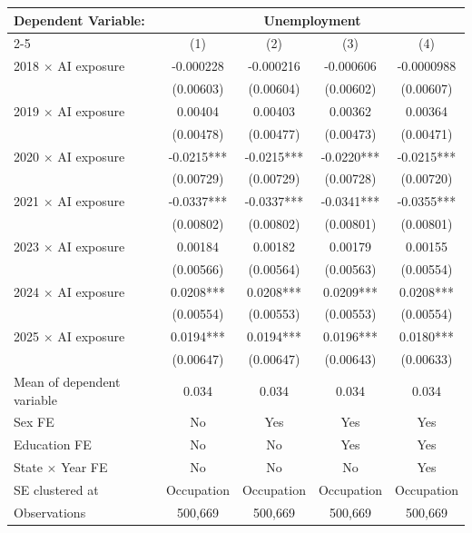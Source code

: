 \def\sym#1{\ifmmode^{#1}\else\(^{#1}\)\fi}
\begin{tabular}{l*{4}{c}}
\toprule
Dependent Variable: & \multicolumn{4}{c}{Unemployment} \\
\cmidrule(lr){2-5}
 & (1) & (2) & (3) & (4) \\
\midrule
2018 $\times$ AI exposure&   -0.000228   &   -0.000216   &   -0.000606   &  -0.0000988   \\
            &   (0.00603)   &   (0.00604)   &   (0.00602)   &   (0.00607)   \\
2019 $\times$ AI exposure&     0.00404   &     0.00403   &     0.00362   &     0.00364   \\
            &   (0.00478)   &   (0.00477)   &   (0.00473)   &   (0.00471)   \\
2020 $\times$ AI exposure&     -0.0215***&     -0.0215***&     -0.0220***&     -0.0215***\\
            &   (0.00729)   &   (0.00729)   &   (0.00728)   &   (0.00720)   \\
2021 $\times$ AI exposure&     -0.0337***&     -0.0337***&     -0.0341***&     -0.0355***\\
            &   (0.00802)   &   (0.00802)   &   (0.00801)   &   (0.00801)   \\
2023 $\times$ AI exposure&     0.00184   &     0.00182   &     0.00179   &     0.00155   \\
            &   (0.00566)   &   (0.00564)   &   (0.00563)   &   (0.00554)   \\
2024 $\times$ AI exposure&      0.0208***&      0.0208***&      0.0209***&      0.0208***\\
            &   (0.00554)   &   (0.00553)   &   (0.00553)   &   (0.00554)   \\
2025 $\times$ AI exposure&      0.0194***&      0.0194***&      0.0196***&      0.0180***\\
            &   (0.00647)   &   (0.00647)   &   (0.00643)   &   (0.00633)   \\
\midrule
Mean of dependent variable&       0.034   &       0.034   &       0.034   &       0.034   \\
Sex FE      &          No   &         Yes   &         Yes   &         Yes   \\
Education FE&          No   &          No   &         Yes   &         Yes   \\
State $\times$ Year FE&          No   &          No   &          No   &         Yes   \\
SE clustered at&  Occupation   &  Occupation   &  Occupation   &  Occupation   \\
Observations&     500,669   &     500,669   &     500,669   &     500,669   \\
\bottomrule
\end{tabular}
